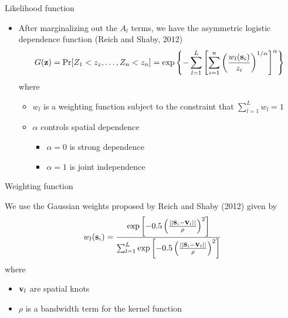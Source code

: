 \documentclass{beamer}
\begin{document}
\begin{frame}{Likelihood function}
  \begin{itemize} \setlength{\itemsep}{1em}
    \item After marginalizing out the $A_l$ terms, we have the asymmetric logistic dependence function (Reich and Shaby, 2012)
    \footnotesize{
    \begin{align*}
      G(\mbox{\bf z}) = \Pr[Z_1 < z_z, \ldots, Z_n < z_n] = \exp\left\{ - \sum_{l = 1}^{L} \left[ \sum_{i = 1}^n \left( \frac{ w_l(\mbox{\bf s}_i) }{ z_i } \right)^{ 1 / \alpha} \right]^\alpha \right\}
    \end{align*}
    }
    where
    \begin{itemize} \setlength{\itemsep}{0.25em}
      \item $w_l$ is a weighting function subject to the constraint that $\sum_{l = 1}^L w_l = 1$
      \item $\alpha$ controls spatial dependence
      \begin{itemize}
        \item $\alpha = 0$ is strong dependence
        \item $\alpha = 1$ is joint independence
      \end{itemize}
    \end{itemize}
  \end{itemize}
\end{frame}

\begin{frame}{Weighting function}
\begin{adjustwidth}{1em}{0em}
  We use the Gaussian weights proposed by Reich and Shaby (2012) given by
  \footnotesize{
  \begin{align*}
    w_l(\mbox{\bf s}_i) = \frac{ \exp\left[ -0.5 \left( \frac{ || \mbox{\bf s}_i - \mbox{\bf v}_l || }{ \rho} \right)^2 \right]}{ \sum_{l = 1}^L \exp\left[ -0.5 \left( \frac{ || \mbox{\bf s}_i - \mbox{\bf v}_l || }{ \rho} \right)^2 \right] }
  \end{align*}
  }
  where
  \begin{itemize} \setlength{\itemsep}{0.25em}
    \item $\mbox{\bf v}_l$ are spatial knots
    \item $\rho$ is a bandwidth term for the kernel function
  \end{itemize}
\end{adjustwidth}
\end{frame}
\end{document}
